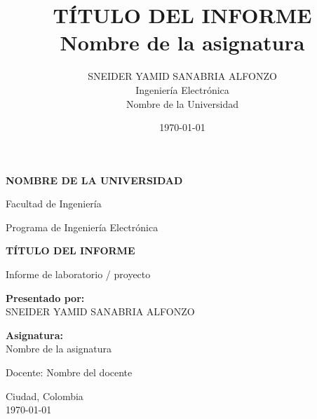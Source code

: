 \documentclass[12pt,a4paper]{article}
\title{
    \textbf{TÍTULO DEL INFORME}\\[0.5cm]
    \large Nombre de la asignatura
}
\author{
    SNEIDER YAMID SANABRIA ALFONZO\\
    Ingeniería Electrónica\\
    Nombre de la Universidad
}
\date{\today}
\begin{document}

\begin{titlepage}

    \centering

    {\Large \textbf{NOMBRE DE LA UNIVERSIDAD}\par}
    
    \vspace{0.5cm}
    
    {\large Facultad de Ingeniería\par}
    
    \vspace{0.5cm}
    
    {\large Programa de Ingeniería Electrónica\par}

    \vfill

    {\LARGE \textbf{TÍTULO DEL INFORME}\par}

    \vspace{1cm}

    {\large Informe de laboratorio / proyecto\par}

    \vfill

    \textbf{Presentado por:}\\
    SNEIDER YAMID SANABRIA ALFONZO

    \vspace{1cm}

    \textbf{Asignatura:}\\
    Nombre de la asignatura

    \vfill

    Docente: Nombre del docente

    \vspace{1cm}

    Ciudad, Colombia\\
    \today

\end{titlepage}


\tableofcontents

\newpage

\end{document}

